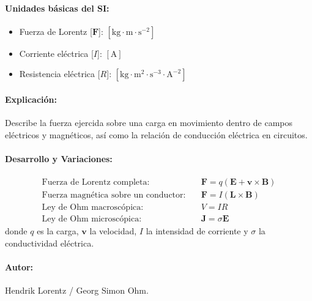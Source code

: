 \documentclass[12pt,a4paper]{article}
\begin{document}
\paragraph*{Unidades básicas del SI:}
\begin{itemize}
    \item Fuerza de Lorentz [$\mathbf{F}$]: $[\text{kg}\cdot\text{m}\cdot\text{s}^{-2}]$
    \item Corriente eléctrica [$I$]: $[\text{A}]$
    \item Resistencia eléctrica [$R$]: $[\text{kg}\cdot\text{m}^2\cdot\text{s}^{-3}\cdot\text{A}^{-2}]$
\end{itemize}
\paragraph*{Explicación:} Describe la fuerza ejercida sobre una carga en movimiento dentro de campos eléctricos y magnéticos, así como la relación de conducción eléctrica en circuitos.
\paragraph*{Desarrollo y Variaciones:}
\begin{align*}
\text{Fuerza de Lorentz completa:} \quad & \mathbf{F} = q (\mathbf{E} + \mathbf{v} \times \mathbf{B}) \\
\text{Fuerza magnética sobre un conductor:} \quad & \mathbf{F} = I (\mathbf{L} \times \mathbf{B}) \\
\text{Ley de Ohm macroscópica:} \quad & V = I R \\
\text{Ley de Ohm microscópica:} \quad & \mathbf{J} = \sigma \mathbf{E}
\end{align*}
donde $q$ es la carga, $\mathbf{v}$ la velocidad, $I$ la intensidad de corriente y $\sigma$ la conductividad eléctrica.
\paragraph*{Autor:} Hendrik Lorentz / Georg Simon Ohm.
\end{document}

